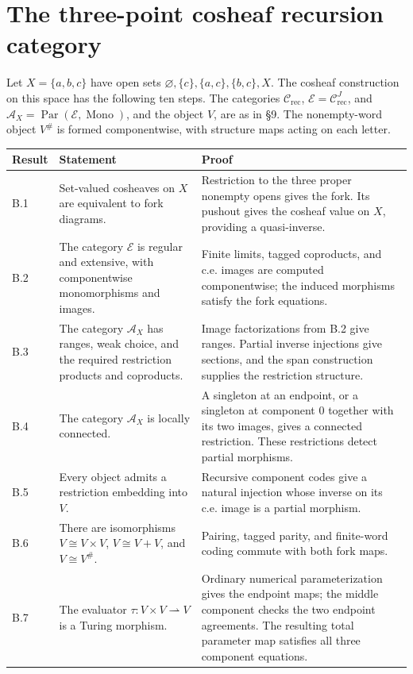 \documentclass[11pt]{article}
\theoremstyle{definition}\newtheorem{definition}[theorem]{Definition}
\newcommand{\Par}{\operatorname{Par}}
\newcommand{\A}{\mathcal A}
\newcommand{\E}{\mathcal E}
\begin{document}
\section{The three-point cosheaf recursion category}
Let $X=\{a,b,c\}$ have open sets
$\varnothing,\{c\},\{a,c\},\{b,c\},X$. The cosheaf construction
on this space has the following ten steps. The categories
$\mathcal C_{\mathrm{rec}}$, $\E=\mathcal C_{\mathrm{rec}}^J$,
and $\A_X=\Par(\E,\operatorname{Mono})$, and the object $V$,
are as in \S9. The nonempty-word object $V^\#$ is formed
componentwise, with structure maps acting on each letter.
\begin{longtable}{@{}p{}p{}p{}@{}}
\toprule
Result & Statement & Proof\\\midrule\endhead
B.1 & Set-valued cosheaves on $X$ are equivalent to fork diagrams. & Restriction to the three proper nonempty opens gives the fork. Its pushout gives the cosheaf value on $X$, providing a quasi-inverse.\\
B.2 & The category $\E$ is regular and extensive, with componentwise monomorphisms and images. & Finite limits, tagged coproducts, and c.e. images are computed componentwise; the induced morphisms satisfy the fork equations.\\
B.3 & The category $\A_X$ has ranges, weak choice, and the required restriction products and coproducts. & Image factorizations from B.2 give ranges. Partial inverse injections give sections, and the span construction supplies the restriction structure.\\
B.4 & The category $\A_X$ is locally connected. & A singleton at an endpoint, or a singleton at component $0$ together with its two images, gives a connected restriction. These restrictions detect partial morphisms.\\
B.5 & Every object admits a restriction embedding into $V$. & Recursive component codes give a natural injection whose inverse on its c.e. image is a partial morphism.\\
B.6 & There are isomorphisms $V\cong V\times V$, $V\cong V+V$, and $V\cong V^\#$. & Pairing, tagged parity, and finite-word coding commute with both fork maps.\\
B.7 & The evaluator $\tau:V\times V\rightharpoonup V$ is a Turing morphism. & Ordinary numerical parameterization gives the endpoint maps; the middle component checks the two endpoint agreements. The resulting total parameter map satisfies all three component equations.\\

\end{longtable}
\end{document}
